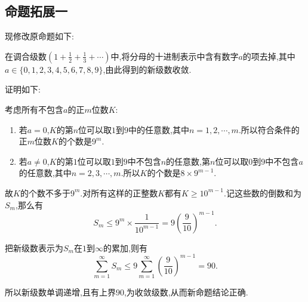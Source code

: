 \documentclass[a4paper,12pt]{article}
\begin{document}
\begin{CJK*}{UTF8}{gbsn}
\subsection{命题拓展一}
\noindent 现修改原命题如下:\par\vspace{5pt}
在调合级数$\displaystyle(1+\frac{1}{2}+\frac{1}{3}+\cdots)$中,将分母的十进制表示中含有数字$a$的项去掉,其中$a\in\{0,1,2,3,4,5,6,7,8,9\}$,由此得到的新级数收敛.\par\vspace{10pt}
\noindent 证明如下:\par\vspace{5pt}
考虑所有不包含$a$的正$m$位数$K$:\par
\begin{enumerate}
\item 若$a=0$,$K$的第$n$位可以取$1$到$9$中的任意数,其中$n=1,2,\cdots,m$.所以符合条件的正$m$位数$K$的个数是$9^m$.
\item 若$a\not=0$,$K$的第$1$位可以取$1$到$9$中不包含$n$的任意数,第$n$位可以取0到9中不包含$a$的任意数,其中$n=2,3,\cdots,m$.所以$K$的个数是$8\times9^{m-1}$.
\end{enumerate}\par
故$K$的个数不多于$9^m$.对所有这样的正整数$K$都有$K\geqslant10^{m-1}$.记这些数的倒数和为$S_m$,那么有
\begin{equation*}
S_m\leqslant9^m\times\frac{1}{10^{m-1}}=9(\frac{9}{10})^{m-1}.
\end{equation*}\par
把新级数表示为$S_m$在$1$到$\infty$的累加,则有
\begin{equation*}
\sum_{m=1}^{\infty}S_m\leqslant9\sum_{m=1}^{\infty}(\frac{9}{10})^{m-1}=90.
\end{equation*}\par
所以新级数单调递增,且有上界$90$,为收敛级数,从而新命题结论正确.


\end{CJK*}
\end{document}

